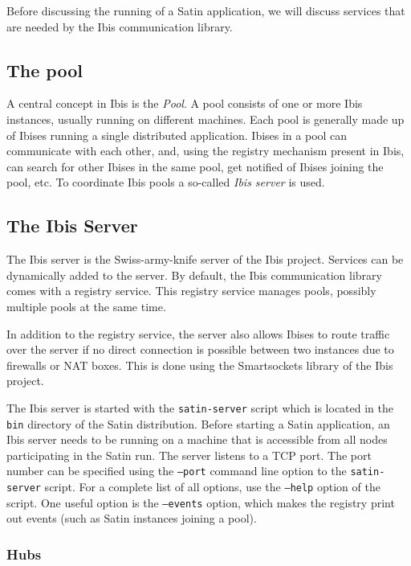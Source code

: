 \documentclass[a4paper,10pt]{article}
\begin{document}
Before discussing
the running of a Satin application, we will discuss services that are
needed by the Ibis communication library.

\subsection{The pool}

A central concept in Ibis is the \emph{Pool}. A pool consists of one or
more Ibis instances, usually running on different machines. Each pool is
generally made up of Ibises running a single distributed application.
Ibises in a pool can communicate with each other, and, using the
registry mechanism present in Ibis, can search for other Ibises in the
same pool, get notified of Ibises joining the pool, etc. To
coordinate Ibis pools a so-called \emph{Ibis server} is used.

\subsection{The Ibis Server}

The Ibis server is the Swiss-army-knife server of the Ibis project.
Services can be dynamically added to the server. By default, the Ibis
communication library comes with a registry service. This registry
service manages pools, possibly multiple pools at the same time.

In addition to the registry service, the server also allows
Ibises to route traffic over the server if no direct connection is
possible between two instances due to firewalls or NAT boxes. This is
done using the Smartsockets library of the Ibis project.

The Ibis server is started with the \texttt{satin-server} script which is
located in the \texttt{bin} directory of the Satin distribution.  Before
starting a Satin application, an Ibis server needs to be running on a
machine that is accessible from all nodes participating in the Satin run.
The server listens to a TCP port. The port number can be specified using
the \texttt{--port} command line option to the \texttt{satin-server}
script.  For a complete list of all options, use the \texttt{--help}
option of the script. One useful option is the  \texttt{--events}
option, which makes the registry print out events (such as Satin instances
joining a pool).

\subsubsection{Hubs}
\label{hubs}
\end{document}
